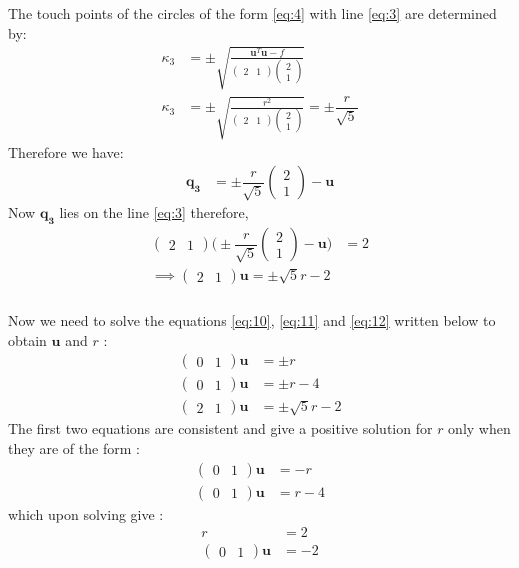 \documentclass{beamer}
\newcommand{\myvec}[1]{\ensuremath{\begin{pmatrix}#1\end{pmatrix}}}
\renewcommand{\vec}[1]{\mathbf{#1}}
\begin{document}
\begin{frame}
\frametitle{}
The touch points of the circles of the form \eqref{eq:4}  with line \eqref{eq:3} are determined by:
\begin{align}
\kappa_{3} &= \pm \sqrt{\frac{\vec{u}^T\vec{u}-f}{\myvec{2 & 1 }\myvec{2 \\ 1 }}} \\
\kappa_{3} &= \pm \sqrt{\frac{r^2}{\myvec{2 & 1 }\myvec{2 \\ 1 }}} =  \pm \dfrac{r}{\sqrt{5}}
\end{align}
Therefore we have:
\begin{align}
\vec{q_{3}} &= \pm \dfrac{r}{\sqrt{5}}\myvec{2 \\ 1} - \vec{u}
\end{align}
Now $\vec{q_{3}}$ lies on the line \eqref{eq:3} therefore,
\begin{align}
\myvec{2 & 1}\Big(\pm \dfrac{r}{\sqrt{5}}\myvec{2 \\ 1} - \vec{u}\Big) &= 2 \\
\implies \myvec{2 & 1}\vec{u} = \pm\sqrt{5}r-2\label{eq:12}
\end{align}
\end{frame}

\begin{frame}
\frametitle{}
Now we need to solve the equations \eqref{eq:10}, \eqref{eq:11} and \eqref{eq:12} written below to obtain $\vec{u}$ and $r$ :
\begin{align}
\myvec{0 & 1}\vec{u} &= \pm{r}\nonumber\\
\myvec{0 & 1}\vec{u} &= \pm{r}-4\nonumber\\
\myvec{2 & 1}\vec{u} &= \pm\sqrt{5}r-2\nonumber
\end{align}
The first two equations are consistent and give a positive solution for $r$ only when they are of the form :
\begin{align}
\myvec{0 & 1}\vec{u} &= -r\nonumber\\
\myvec{0 & 1}\vec{u} &= r-4\nonumber
\end{align}
which upon solving give :
\begin{align}
r &= 2\label{eq:13}\\
\myvec{0 & 1}\vec{u} &= -2\label{eq:14}
\end{align}
\end{frame}
\end{document}

